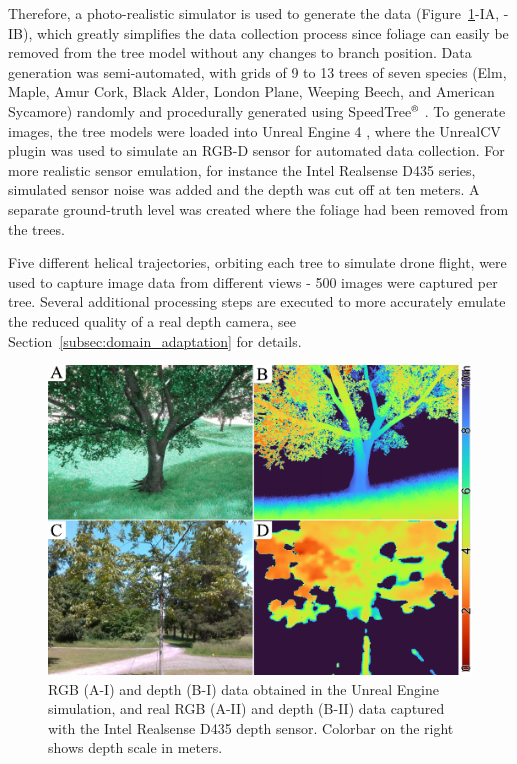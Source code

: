 Therefore, a photo-realistic simulator is used to generate the data (Figure~\ref{fig-3-sim-training}-IA, -IB), which greatly simplifies the data collection process since foliage can easily be removed from the tree model without any changes to branch position. Data generation was semi-automated, with grids of 9 to 13 trees of seven species (Elm, Maple, Amur Cork, Black Alder, London Plane, Weeping Beech, and American Sycamore) randomly and procedurally generated using SpeedTree$^\text{\textregistered}$ \cite{SpeedTree}. To generate images, the tree models were loaded into Unreal Engine 4 \cite{Unreal4.27}, where the UnrealCV plugin \cite{UnrealCV} was used to simulate an RGB-D sensor for automated data collection. For more realistic sensor emulation, for instance the Intel Realsense D435 series, simulated sensor noise was added \cite{Ahn2019AnalysisRobots} and the depth was cut off at ten meters. A separate ground-truth level was created where the foliage had been removed from the trees. 

Five different helical trajectories, orbiting each tree to simulate drone flight, were used to capture image data from different views - 500 images were captured per tree. Several additional processing steps are executed to more accurately emulate the reduced quality of a real depth camera, see Section~\ref{subsec:domain_adaptation} for details. 
\begin{figure}[!t]
\centering
\includegraphics[width=1\columnwidth]{figures/fig-3-sim-training/fig-3-sim-training-v02.pdf}
\vspace{\figurevspaceabove}
\caption{RGB (A-I) and depth (B-I) data obtained in the Unreal Engine simulation, and real RGB (A-II) and depth (B-II) data captured with the Intel Realsense D435 depth sensor. Colorbar on the right shows depth scale in meters.}
\label{fig-3-sim-training}
\vspace{\figurevspacebelow}
\end{figure}

